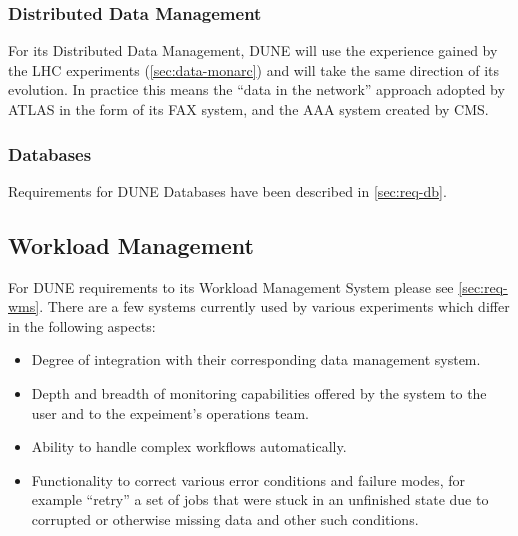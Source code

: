 \subsubsection{Distributed Data Management}
For its Distributed Data Management, DUNE will use the experience gained by the LHC experiments (\ref{sec:data-monarc}) and will
take the same direction of its evolution. In practice this means the ``data in the network'' approach adopted by ATLAS in the form of its FAX system,
and the AAA system created by CMS.


\subsubsection{Databases}
Requirements for DUNE Databases have been described in \ref{sec:req-db}.


\subsection{Workload Management}
\label{sec:dune-wms}
For DUNE requirements to its Workload Management System please see \ref{sec:req-wms}. There are a few systems currently used by various experiments which
differ in the following aspects:
\begin{itemize}

\item Degree of integration with their corresponding data management system.

\item Depth and breadth of monitoring capabilities offered by the system to the user and to the expeiment's operations team.

\item Ability to handle complex workflows automatically.

\item Functionality to correct various error conditions and failure modes, for example ``retry'' a set of jobs that were stuck in an unfinished state
due to corrupted or otherwise missing data and other such conditions.

\end{itemize}

